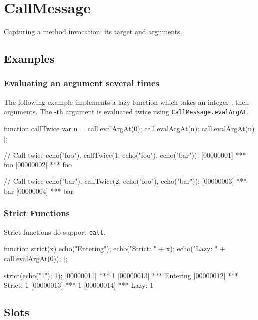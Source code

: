 \section{CallMessage}
Capturing a method invocation: its target and arguments.

\subsection{Examples}
\subsubsection{Evaluating an argument several times}
\label{sec:std-callmsg-examples-several}

The following example implements a lazy function which takes an
integer , then arguments.  The -th argument is evaluated
twice using \lstinline|CallMessage.evalArgAt|.

\begin{urbiscript}[firstnumber=1]
function callTwice
{
  var n = call.evalArgAt(0);
  call.evalArgAt(n);
  call.evalArgAt(n)
} |;

// Call twice echo("foo").
callTwice(1, echo("foo"), echo("bar"));
[00000001] *** foo
[00000002] *** foo

// Call twice echo("bar").
callTwice(2, echo("foo"), echo("bar"));
[00000003] *** bar
[00000004] *** bar
\end{urbiscript}


\subsubsection{Strict Functions}

Strict functions do support \lstinline|call|.

\begin{urbiscript}
function strict(x)
{
  echo("Entering");
  echo("Strict: " + x);
  echo("Lazy:   " + call.evalArgAt(0));
} |;

strict({echo("1"); 1});
[00000011] *** 1
[00000013] *** Entering
[00000012] *** Strict: 1
[00000013] *** 1
[00000014] *** Lazy:   1
\end{urbiscript}


\subsection{Slots}


